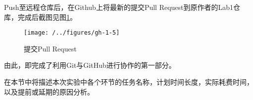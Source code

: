 Push至远程仓库后，在Github上将最新的提交Pull Request到原作者的Lab1仓库，完成后截图见图\ref{fig:gh-1-5}。

\begin{figure}
\centering
\texttt{[image: /../figures/gh-1-5]}
\caption{提交Pull Request}
\label{fig:gh-1-5}
\end{figure}

由此，即完成了利用Git与GitHub进行协作的第一部分。



在本节中将描述本次实验中各个环节的任务名称，计划时间长度，实际耗费时间，以及提前或延期的原因分析。



